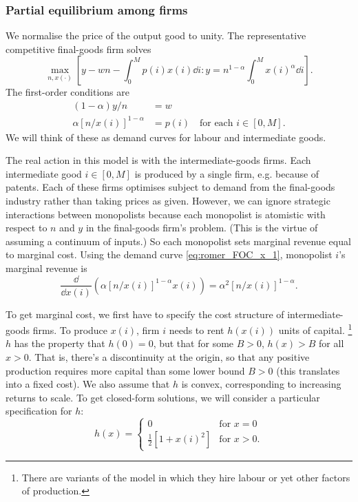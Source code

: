 \documentclass[11pt,letterpaper,reqno,oneside]{article}
\begin{document}
\subsubsection{Partial equilibrium among firms}
\label{sec:02Nov2015:Romer1987_model:partial_eqm}

We normalise the price of the output good to unity. The representative competitive final-goods firm solves
%
\begin{equation*}
	\max_{n,x(\cdot)} \left[ 
	y - w n - \int_0^M p(i) x(i) \dd i 
	: y = n^{1-\alpha} \int_0^M x(i)^\alpha \dd i \right] .
\end{equation*}
%
The first-order conditions are
%
\begin{align}
	(1-\alpha) y / n &= w
	\label{eq:romer_FOC_n_1}
	\\
	\alpha [ n / x(i) ]^{1-\alpha} &= p(i)
	\quad\text{for each $i \in [0,M]$} .
	\label{eq:romer_FOC_x_1}
\end{align}
%
We will think of these as demand curves for labour and intermediate goods.


The real action in this model is with the intermediate-goods firms. Each intermediate good $i \in [0,M]$ is produced by a single firm, e.g. because of patents. Each of these firms optimises subject to demand from the final-goods industry rather than taking prices as given. However, we can ignore strategic interactions between monopolists because each monopolist is atomistic with respect to $n$ and $y$ in the final-goods firm's problem. (This is the virtue of assuming a continuum of inputs.) So each monopolist sets marginal revenue equal to marginal cost. Using the demand curve \eqref{eq:romer_FOC_x_1}, monopolist $i$'s marginal revenue is
%
\begin{equation*}
	\frac{\dd}{\dd x(i)} \left( \alpha [n/x(i)]^{1-\alpha} x(i) \right)
	= \alpha^2 [n/x(i)]^{1-\alpha} .
\end{equation*}

To get marginal cost, we first have to specify the cost structure of intermediate-goods firms. To produce $x(i)$, firm $i$ needs to rent $h(x(i))$ units of capital.%
	\footnote{There are variants of the model in which they hire labour or yet other factors of production.}
$h$ has the property that $h(0) = 0$, but that for some $B>0$, $h(x)>B$ for all $x>0$. That is, there's a discontinuity at the origin, so that any positive production requires more capital than some lower bound $B > 0$ (this translates into a fixed cost). We also assume that $h$ is convex, corresponding to increasing returns to scale. To get closed-form solutions, we will consider a particular specification for $h$:
%
\begin{equation*}
	h(x) = \begin{cases}
	0
	&\text{for $x=0$}
	\\
	\frac{1}{2} \left[ 1 + x(i)^2 \right]
	&\text{for $x>0$} .
	\end{cases}
\end{equation*}
\end{document}
